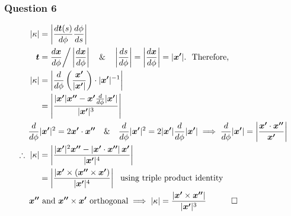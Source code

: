 \documentclass[12pt, a4paper]{article}
\begin{document}
\subsubsection*{Question 6}

\begin{align}
	|\kappa| & = \left\vert\frac{d\bm{t}(s)}{d\phi}\frac{d\phi}{ds}\right\vert\nonumber\\
	\bm{t}  & = \frac{d\bm{x}}{d\phi}\text{\bigg/}\left\vert\frac{d\bm{x}}{d\phi}\right\vert \text{ ~~\&~~ } \left\vert\frac{ds}{d\phi}\right\vert = \left\vert\frac{d\bm{x}}{d\phi}\right\vert = |\bm{x'}|. ~~ \text{Therefore,}\nonumber\\
	|\kappa| & = \left\vert \frac{d}{d\phi}\left(\frac{\bm{x'}}{|\bm{x'}|}\right) \cdot |\bm{x'}|^{-1}\right\vert \nonumber\\
	& = \left\vert\frac{|\bm{x'}|\bm{x''} - \bm{x'}\frac{d}{d\phi}|\bm{x'}|}{|\bm{x'}|^{3}}\right\vert \nonumber\\
	\frac{d}{d\phi} & |\bm{x'}|^{2} = 2\bm{x'}\cdot\bm{x''} \text{ ~~\&~~ } \frac{d}{d\phi}|\bm{x'}|^{2} = 2|\bm{x'}|\frac{d}{d\phi}|\bm{x'}| \implies \frac{d}{d\phi}|\bm{x'}| = \left\vert \frac{\bm{x'} \cdot \bm{x''}}{\bm{x'}} \right\vert \nonumber\\
	\therefore ~ |\kappa| & = \left\vert\frac{|\bm{x'}|^{2}\bm{x''} - \left\vert \bm{x'}\cdot\bm{x''} \right\vert\bm{x'}}{|\bm{x'}|^{4}}\right\vert \nonumber\\
	& = \left\vert \frac{|\bm{x'} \times (\bm{x''} \times \bm{x'})}{|\bm{x'}|^{4}} \right\vert \text{ ~using triple product identity} \nonumber\\
	~ \bm{x''} & \text{ and } \bm{x''} \times \bm{x'} \text{ orthogonal} \implies |\kappa| = \frac{|\bm{x'} \times \bm{x''}|}{|\bm{x'}|^{3}} ~~~ \qed \nonumber
\end{align}
\end{document}
